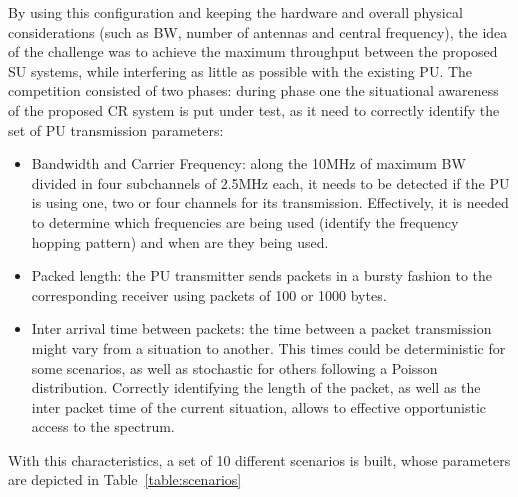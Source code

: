 By using this configuration and keeping the hardware and overall physical considerations (such as \ac{BW}, number of antennas and central frequency),
the idea of the challenge was to achieve the maximum throughput between the proposed \ac{SU} systems, while interfering as little as possible with the existing \ac{PU}. The competition consisted of two phases: during phase one the situational awareness of the proposed \ac{CR} system is put under test, as it need to correctly identify the set of \ac{PU} transmission parameters:

\begin{itemize}
    \item Bandwidth and Carrier Frequency: along the 10MHz of maximum \ac{BW} divided in four subchannels of 2.5MHz each, it needs to be detected if the \ac{PU} is using one, two or four channels for its transmission. Effectively, it is needed to determine which frequencies are being used (identify the frequency hopping pattern) and when are they being used.
    \item Packed length: the \ac{PU} transmitter sends packets in a bursty fashion to the corresponding receiver using packets of 100 or 1000 bytes.
    \item Inter arrival time between packets: the time between a packet transmission might vary from a situation to another. This times could be deterministic for some scenarios, as well as stochastic for others following a Poisson distribution. Correctly identifying the length of the packet, as well as the inter packet time of the current situation, allows to effective opportunistic access to the spectrum.
\end{itemize}

With this characteristics, a set of 10 different scenarios is built, whose parameters are depicted in Table~\ref{table:scenarios}

